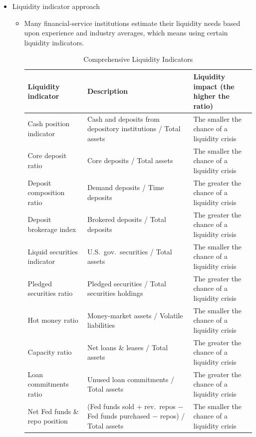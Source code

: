 \begin{itemize}
\item Liquidity indicator approach
    \begin{itemize}
    \item Many financial-service institutions estimate their liquidity needs based upon experience and industry averages, which means using certain liquidity indicators.
    
   
    \begin{table}[H]
        \centering
        \begin{tabular}{|p{3cm}|p{6.5cm}|p{6.5cm}|}
        \hline
        \rowcolor{gray!20}
        \textbf{Liquidity indicator} & \textbf{Description} & \textbf{Liquidity impact (the higher the ratio)} \\ \hline
        Cash position indicator & Cash and deposits from depository institutions / Total assets & The smaller the chance of a liquidity crisis \\
        Core deposit ratio & Core deposits / Total assets & The smaller the chance of a liquidity crisis \\
        Deposit composition ratio & Demand deposits / Time deposits & The greater the chance of a liquidity crisis \\
        Deposit brokerage index & Brokered deposits / Total deposits & The greater the chance of a liquidity crisis \\ \hline
        Liquid securities indicator & U.S.\ gov.\ securities / Total assets & The smaller the chance of a liquidity crisis \\
        Pledged securities ratio & Pledged securities / Total securities holdings & The greater the chance of a liquidity crisis \\
        Hot money ratio & Money‐market assets / Volatile liabilities & The smaller the chance of a liquidity crisis \\ \hline
        Capacity ratio & Net loans \& leases / Total assets & The greater the chance of a liquidity crisis \\
        Loan commitments ratio & Unused loan commitments / Total assets & The greater the chance of a liquidity crisis \\
        Net Fed funds \& repo position & (Fed funds sold + rev.\ repos − Fed funds purchased − repos) / Total assets & The smaller the chance of a liquidity crisis \\ \hline
        \end{tabular}
        \caption{Comprehensive Liquidity Indicators}\label{tab:liquidity-ind}
        \end{table}
    \end{itemize}
\end{itemize}






